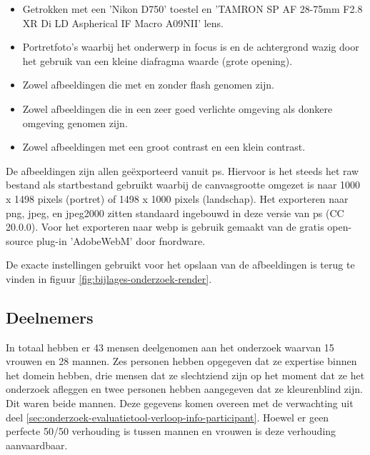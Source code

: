 \begin{itemize}
	\item Getrokken met een 'Nikon D750' toestel en 'TAMRON SP AF 28-75mm F2.8 XR Di LD Aspherical IF Macro A09NII' lens.
	
	\item Portretfoto's waarbij het onderwerp in focus is en de achtergrond wazig door het gebruik van een kleine diafragma waarde (grote opening).
	
	\item Zowel afbeeldingen die met en zonder flash genomen zijn.
	
	\item Zowel afbeeldingen die in een zeer goed verlichte omgeving als donkere omgeving genomen zijn.
	
	\item Zowel afbeeldingen met een groot contrast en een klein contrast.
\end{itemize}

De afbeeldingen zijn allen geëxporteerd vanuit \gls{ps}. Hiervoor is het steeds het \gls{raw} bestand als startbestand gebruikt waarbij de canvasgrootte omgezet is naar 1000 x 1498 \glspl{pixel} (portret) of 1498 x 1000 \glspl{pixel} (landschap). Het exporteren naar \gls{png}, \gls{jpeg}, en \gls{jpeg2000} zitten standaard ingebouwd in deze versie van \gls{ps} (CC 20.0.0). Voor het exporteren naar \gls{webp} is gebruik gemaakt van de gratis \gls{open-source} \gls{plug-in} 'AdobeWebM' door fnordware.

De exacte instellingen gebruikt voor het opslaan van de afbeeldingen is terug te vinden in figuur \ref{fig:bijlages-onderzoek-render}.

\subsection{Deelnemers}
\label{sec:onderzoek-uitvoering-deelnemers}

In totaal hebben er 43 mensen deelgenomen aan het onderzoek waarvan 15 vrouwen en 28 mannen. Zes personen hebben opgegeven dat ze expertise binnen het domein hebben, drie mensen dat ze slechtziend zijn op het moment dat ze het onderzoek afleggen en twee personen hebben aangegeven dat ze kleurenblind zijn. Dit waren beide mannen. Deze gegevens komen overeen met de verwachting uit deel \ref{sec:onderzoek-evaluatietool-verloop-info-participant}. Hoewel er geen perfecte 50/50 verhouding is tussen mannen en vrouwen is deze verhouding aanvaardbaar.

